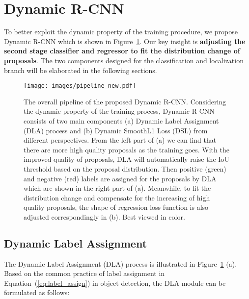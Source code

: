 \documentclass[runningheads]{llncs}
\begin{document}
\section{Dynamic R-CNN}
\label{sec:dynamic_rcnn}

To better exploit the dynamic property of the training procedure, we propose Dynamic R-CNN which is shown in Figure~\ref{fig:pipeline}. Our key insight is \textbf{adjusting the second stage classifier and regressor to fit the distribution change of proposals}. The two components designed for the classification and localization branch will be elaborated in the following sections.


\begin{figure}[!t]
    \centering
    \texttt{[image: images/pipeline\_new.pdf]}
    \caption{The overall pipeline of the proposed Dynamic R-CNN. Considering the dynamic property of the training process, Dynamic R-CNN consists of two main components (a) Dynamic Label Assignment (DLA) process and (b) Dynamic SmoothL1 Loss (DSL) from different perspectives. From the left part of (a) we can find that there are more high quality proposals as the training goes. With the improved quality of proposals, DLA will automatically raise the IoU threshold based on the proposal distribution. Then positive (green) and negative (red) labels are assigned for the proposals by DLA which are shown in the right part of (a). Meanwhile, to fit the distribution change and compensate for the increasing of high quality proposals, the shape of regression loss function is also adjusted correspondingly in (b). Best viewed in color.}
    \label{fig:pipeline}
\end{figure}


\subsection{Dynamic Label Assignment}

The Dynamic Label Assignment (DLA) process is illustrated in Figure~\ref{fig:pipeline} (a). Based on the common practice of label assignment in Equation~(\ref{eq:label_assign}) in object detection, the DLA module can be formulated as follows:
\end{document}
